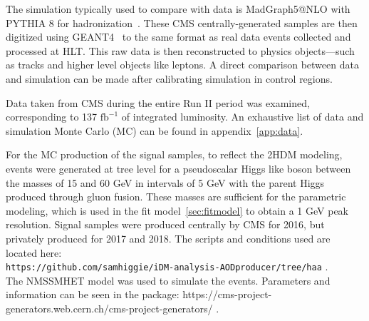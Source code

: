 The simulation typically used to compare with data is MadGraph5@NLO with PYTHIA 8 for hadronization~\cite{PYTHIA}. These CMS centrally-generated samples are then digitized using GEANT4~\cite{GEANT4} to the same format as real data events collected and processed at HLT. This raw data is then reconstructed to physics objects---such as tracks and higher level objects like leptons. A direct comparison between data and simulation can be made after calibrating simulation in control regions. 

Data taken from CMS during the entire Run II period was examined, corresponding to 137 $\text{fb}^{-1}$ of integrated luminosity. An exhaustive list of data and simulation Monte Carlo (MC) can be found in appendix~\ref{app:data}.   

For the MC production of the signal samples, to reflect the 2HDM modeling, events were generated at tree level for a pseudoscalar Higgs like boson between the masses of 15 and 60 GeV in intervals of 5 GeV with the parent Higgs produced through gluon fusion. These masses are sufficient for the parametric modeling, which is used in the fit model~\ref{sec:fitmodel} to obtain a 1 GeV peak resolution. Signal samples were produced centrally by CMS for 2016, but privately produced for 2017 and 2018. The scripts and conditions used are located here:\\
 \texttt{https://github.com/samhiggie/iDM-analysis-AODproducer/tree/haa} .\\
The NMSSMHET model was used to simulate the events. Parameters and information can be seen in the package:
https://cms-project-generators.web.cern.ch/cms-project-generators/ .



